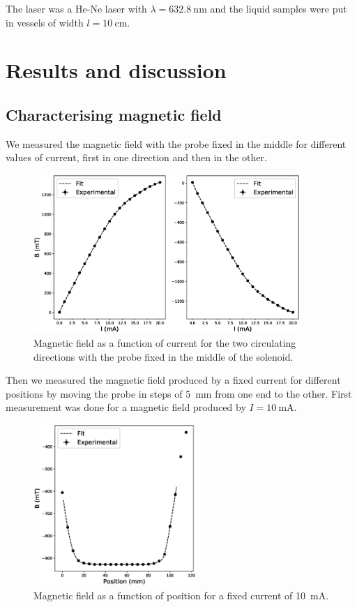 \documentclass[11pt,a4paper]{article}
\begin{document}
The laser was a He-Ne laser with $\lambda=\SI{632.8}{\nm}$ and the liquid samples were put in vessels of width $l=\SI{10}{\cm}$.

\newpage

\section{Results and discussion}

\subsection{Characterising magnetic field}

We measured the magnetic field with the probe fixed in the middle for different values of current, first in one direction and then in the other.

\begin{figure}[H]
\centering
\includegraphics[width=0.9\textwidth]{B_diff_current.eps}
\caption{Magnetic field as a function of current for the two circulating directions with the probe fixed in the middle of the solenoid.}
\label{fig:BvsI}
\end{figure}

Then we measured the magnetic field produced by a fixed current for different positions by moving the probe in steps of \SI{5}{\mm} from one end to the other. First measurement was done for a magnetic field produced by $I=\SI{10}{\mA}$.

\begin{figure}[H]
\centering
\includegraphics[width=0.55\textwidth]{B_diff_position1.eps}
\caption{Magnetic field as a function of position for a fixed current of \SI{10}{\mA}.}
\label{fig:BvsPos1}
\end{figure}
\end{document}
